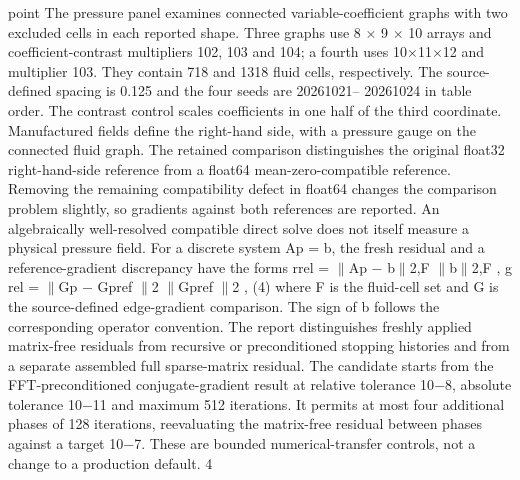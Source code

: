 \documentclass[11pt]{article}
\begin{document}
point
The pressure panel examines connected variable-coefficient graphs with two excluded cells in each
reported shape. Three graphs use 8 \ensuremath{\times} 9 \ensuremath{\times} 10 arrays and coefficient-contrast multipliers 102, 103 and
104; a fourth uses 10\ensuremath{\times}11\ensuremath{\times}12 and multiplier 103. They contain 718 and 1318 fluid cells, respectively.
The source-defined spacing is 0.125 and the four seeds are 20261021– 20261024 in table order. The
contrast control scales coefficients in one half of the third coordinate. Manufactured fields define
the right-hand side, with a pressure gauge on the connected fluid graph.
The retained comparison distinguishes the original float32 right-hand-side reference from a float64
mean-zero-compatible reference. Removing the remaining compatibility defect in float64 changes
the comparison problem slightly, so gradients against both references are reported. An algebraically
well-resolved compatible direct solve does not itself measure a physical pressure field.
For a discrete system Ap = b, the fresh residual and a reference-gradient discrepancy have the forms
rrel = \ensuremath{\parallel}Ap \ensuremath{-} b\ensuremath{\parallel}2,F
\ensuremath{\parallel}b\ensuremath{\parallel}2,F
, g rel = \ensuremath{\parallel}Gp \ensuremath{-} Gpref \ensuremath{\parallel}2
\ensuremath{\parallel}Gpref \ensuremath{\parallel}2
, (4)
where F is the fluid-cell set and G is the source-defined edge-gradient comparison. The sign of b
follows the corresponding operator convention. The report distinguishes freshly applied matrix-free
residuals from recursive or preconditioned stopping histories and from a separate assembled full
sparse-matrix residual.
The candidate starts from the FFT-preconditioned conjugate-gradient result at relative tolerance
10\ensuremath{-}8, absolute tolerance 10\ensuremath{-}11 and maximum 512 iterations. It permits at most four additional
phases of 128 iterations, reevaluating the matrix-free residual between phases against a target 10\ensuremath{-}7.
These are bounded numerical-transfer controls, not a change to a production default.
4
\end{document}
